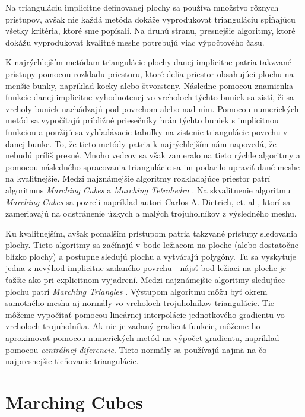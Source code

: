 Na trianguláciu implicitne definovanej plochy sa používa množstvo rôznych prístupov, 
avšak nie každá metóda dokáže vyprodukovať trianguláciu spĺňajúcu všetky kritéria, 
ktoré sme popísali. Na druhú stranu, presnejšie algoritmy, ktoré dokážu vyprodukovať 
kvalitné meshe potrebujú viac výpočtového času. 

K najrýchlejším metódam triangulácie plochy danej implicitne patria takzvané prístupy pomocou rozkladu
priestoru, ktoré delia priestor obsahujúci plochu na menšie bunky, napríklad kocky alebo štvorsteny. 
Následne pomocou znamienka funkcie danej implicitne vyhodnotenej vo vrcholoch týchto buniek
sa zistí, či sa vrcholy buniek nachádzajú pod povrchom alebo nad ním. 
Pomocou numerických metód sa vypočítajú približné priesečníky hrán týchto buniek s 
implicitnou funkciou a použijú sa vyhľadávacie tabuľky na zistenie triangulácie povrchu v danej bunke. 
To, že tieto metódy patria k najrýchlejším nám napovedá, že nebudú príliš presné. Mnoho vedcov sa
však zameralo na tieto rýchle algoritmy a pomocou následného spracovania triangulácie sa im 
podarilo upraviť dané meshe na kvalitnejšie. 
Medzi najznámejšie algoritmy rozkladajúce priestor
patrí algoritmus \textit{Marching Cubes} \cite{lorensen1987marching} a \textit{Marching Tetrahedra} 
\cite{doi1991efficient}. Na skvalitnenie algoritmu \textit{Marching Cubes} sa pozreli napríklad
autori Carlos A. Dietrich, et. al 
\cite{dietrich2009marching}, ktorí sa zameriavajú na odstránenie úzkych a malých trojuholníkov
z výsledného meshu.

Ku kvalitnejším, avšak pomalším prístupom patria takzvané prístupy sledovania plochy.
Tieto algoritmy sa začínajú v bode ležiacom na ploche (alebo dostatočne blízko plochy) a 
postupne sledujú plochu a vytvárajú polygóny. Tu sa vyskytuje jedna z nevýhod implicitne zadaného
povrchu - nájsť bod ležiaci na ploche je ťažšie ako pri explicitnom vyjadrení. Medzi najznámejšie 
algoritmy sledujúce plochu patrí \textit{Marching Triangles} \cite{hilton1996marching}.
Výstupom algoritmu môžu byť okrem samotného meshu aj normály vo vrcholoch trojuholníkov triangulácie. 
Tie môžeme vypočítať pomocou lineárnej interpolácie jednotkového gradientu vo vrcholoch trojuholníka. 
Ak nie je zadaný gradient funkcie, môžeme ho aproximovať pomocou numerických metód na výpočet gradientu,
napríklad pomocou \textit{centrálnej diferencie}.
Tieto normály sa používajú najmä na čo najpresnejšie tieňovanie triangulácie.

\section{Marching Cubes}

